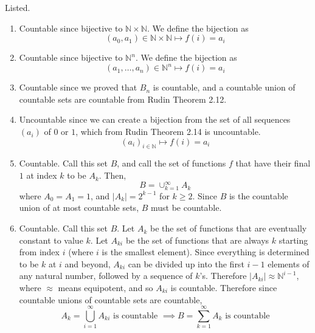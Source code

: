  \begin{solution}
    Listed. 
    \begin{enumerate}
      \item Countable since bijective to $\mathbb{N} \times \mathbb{N}$. We define the bijection as 
      \begin{equation}
        (a_0, a_1) \in \mathbb{N} \times \mathbb{N} \mapsto f(i) = a_i 
      \end{equation}

      \item Countable since bijective to $\mathbb{N}^n$. We define the bijection as 
      \begin{equation}
        (a_1, \ldots, a_n) \in \mathbb{N}^n \mapsto f(i) = a_i
      \end{equation}

      \item Countable since we proved that $B_n$ is countable, and a countable union of countable sets are countable from Rudin Theorem 2.12. 

      \item Uncountable since we can create a bijection from the set of all sequences $(a_i)$ of $0$ or $1$, which from Rudin Theorem 2.14 is uncountable. 
      \begin{equation}
        (a_i)_{i \in \mathbb{N}} \mapsto f(i) = a_i
      \end{equation}

      \item Countable. Call this set $B$, and call the set of functions $f$ that have their final $1$ at index $k$ to be $A_k$. Then, 
      \begin{equation}
        B = \cup_{k=1}^\infty A_k 
      \end{equation}
      where $A_0 = A_1 = 1$, and $|A_k| = 2^{k-1}$ for $k \geq 2$. Since $B$ is the countable union of at most countable sets, $B$ must be countable. 

      \item Countable. Call this set $B$. Let $A_k$ be the set of functions that are eventually constant to value $k$. Let $A_{ki}$ be the set of functions that are always $k$ starting from index $i$ (where $i$ is the smallest element). Since everything is determined to be $k$ at $i$ and beyond, $A_{ki}$ can be divided up into the first $i-1$ elements of any natural number, followed by a sequence of $k$'s. Therefore $|A_{ki}| \approx \mathbb{N}^{i-1}$, where $\approx$ means equipotent, and so $A_{ki}$ is countable. Therefore since countable unions of countable sets are countable, 
      \begin{equation}
        A_k = \bigcup_{i=1}^\infty A_{ki} \text{ is countable } \implies B = \sum_{k=1}^\infty A_k \text{ is countable}
      \end{equation}
    \end{enumerate}
  \end{solution}

